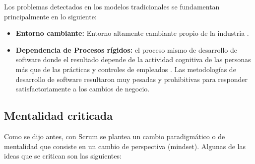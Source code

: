 Los problemas detectados en los modelos tradicionales se fundamentan principalmente en lo siguiente: 

\begin{itemize}

\item \textbf{Entorno cambiante:} Entorno altamente cambiante propio de la industria \cite{Martin-Alaimo-2014}.

\item \textbf{Dependencia de Procesos rígidos:} el proceso mismo de desarrollo de software donde el resultado depende de la actividad
cognitiva de las personas más que de las prácticas y controles de empleados \cite{Martin-Alaimo-2014}. Las metodologías de desarrollo de software resultaron muy pesadas y prohibitivas para responder satisfactoriamente a los cambios de negocio.

\end{itemize}

\subsection{Mentalidad criticada}

Como se dijo antes, con Scrum se plantea un cambio paradigmático o de mentalidad que consiste en un cambio de perspectiva (mindset). Algunas de las ideas que se critican son las siguientes:

